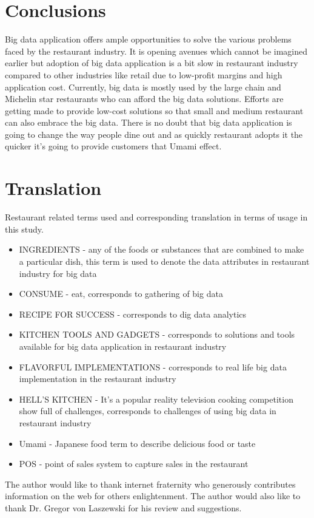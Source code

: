 \documentclass[sigconf]{acmart}
\begin{document}
\section{Conclusions}

Big data application offers ample opportunities to solve the various problems faced by the restaurant industry. It is opening avenues which cannot be imagined earlier but adoption of big data application is a bit slow in restaurant industry compared to other industries like retail due to low-profit margins and high application cost. Currently, big data is mostly used by the large chain and Michelin star restaurants who can afford the big data solutions. Efforts are getting made to provide low-cost solutions so that small and medium restaurant can also embrace the big data. There is no doubt that big data application is going to change the way people dine out and as quickly restaurant adopts it the quicker it's going to provide customers that Umami effect.

\appendix

\section{Translation}
Restaurant related terms used and corresponding translation in terms of usage in this study.
\begin{itemize}
  \item INGREDIENTS - any of the foods or substances that are combined to make a particular dish, this term is used to denote the data attributes in restaurant industry for big data
  \item CONSUME - eat, corresponds to gathering of big data
  \item RECIPE FOR SUCCESS - corresponds to dig data analytics
  \item KITCHEN TOOLS AND GADGETS  - corresponds to solutions and tools available for big data application in restaurant industry
  \item FLAVORFUL IMPLEMENTATIONS - corresponds to real life big data implementation in the restaurant industry
 \item HELL'S KITCHEN - It's a popular reality television cooking competition show full of challenges, corresponds to challenges of using big data in restaurant industry
 \item Umami - Japanese food term to describe delicious food or taste
 \item POS - point of sales system to capture sales in the restaurant
\end{itemize}



\begin{acks}
  The author would like to thank internet fraternity who generously contributes information on the web for others enlightenment.  The author would also like to thank Dr. Gregor von Laszewski for his review and suggestions.
\end{acks}



 
\end{document}
